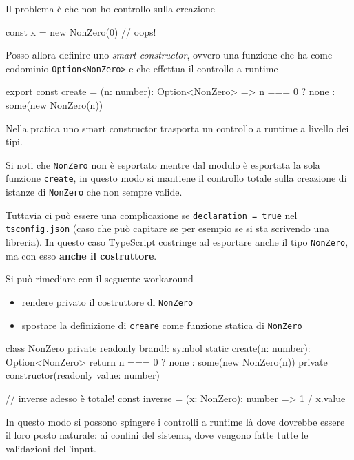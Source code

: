 \documentclass[12pt]{article}
\theoremstyle{definition}
\newenvironment{code}
  {\vspace{0.5cm} \VerbatimEnvironment\begin{typescriptcode}}
  {\end{typescriptcode} \vspace{0.2cm}}
\begin{document}
Il problema è che non ho controllo sulla creazione

\begin{code}
const x = new NonZero(0) // oops!
\end{code}

Posso allora definire uno \emph{smart constructor}, ovvero una funzione che ha come codominio \texttt{Option<NonZero>} e che
effettua il controllo a runtime

\begin{code}
export const create = (n: number): Option<NonZero> =>
  n === 0 ? none : some(new NonZero(n))
\end{code}

Nella pratica uno smart constructor trasporta un controllo a runtime a livello dei tipi.

Si noti che \texttt{NonZero} non è esportato mentre dal modulo è esportata la sola funzione \texttt{create}, in questo
modo si mantiene il controllo totale sulla creazione di istanze di \texttt{NonZero} che non sempre valide.

Tuttavia ci può essere una complicazione se \texttt{declaration = true} nel \texttt{tsconfig.json}
(caso che può capitare se per esempio se si sta scrivendo una libreria). In questo caso
TypeScript costringe ad esportare anche il tipo \texttt{NonZero}, ma con esso \textbf{anche il costruttore}.

Si può rimediare con il seguente workaround

\begin{itemize}
\item rendere privato il costruttore di \texttt{NonZero}
\item spostare la definizione di \texttt{creare} come funzione statica di \texttt{NonZero}
\end{itemize}

\begin{code}
class NonZero {
  private readonly brand!: symbol
  static create(n: number): Option<NonZero> {
    return n === 0 ? none : some(new NonZero(n))
  }
  private constructor(readonly value: number) {}
}

// inverse adesso è totale!
const inverse = (x: NonZero): number => 1 / x.value
\end{code}

In questo modo si possono spingere i controlli a runtime là dove dovrebbe essere il loro posto naturale: ai confini del sistema,
dove vengono fatte tutte le validazioni dell'input.

\newpage
\end{document}
